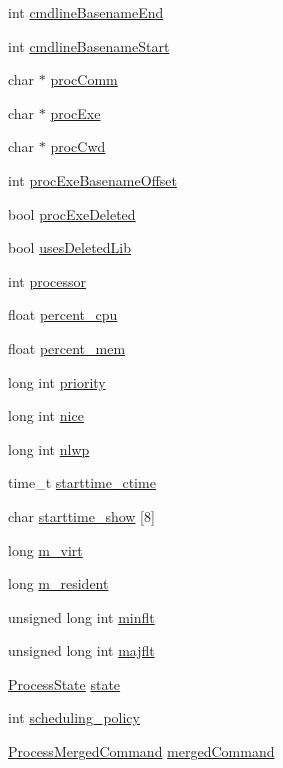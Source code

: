 \begin{DoxyCompactItemize}
\item 
int \hyperlink{structProcess___a2e09e6d44df324f8198c21f3d156bc2f}{cmdline\+Basename\+End}
\item 
int \hyperlink{structProcess___ab09f71b906aa1970ff0abfc0566582a5}{cmdline\+Basename\+Start}
\item 
char $\ast$ \hyperlink{structProcess___a241ff10766056dc26b25b012c05a07ce}{proc\+Comm}
\item 
char $\ast$ \hyperlink{structProcess___a998a39446c951d76abde48ef02d42089}{proc\+Exe}
\item 
char $\ast$ \hyperlink{structProcess___a51ff7b8452bfc3e3e7438219f88c3e98}{proc\+Cwd}
\item 
int \hyperlink{structProcess___a69db29693ef3689f1fe48d897f6270c2}{proc\+Exe\+Basename\+Offset}
\item 
bool \hyperlink{structProcess___a7e09e353d2f5030e4c48a63cf4691fb6}{proc\+Exe\+Deleted}
\item 
bool \hyperlink{structProcess___abd5b9284eb5b84fc55ecbae0713e2056}{uses\+Deleted\+Lib}
\item 
int \hyperlink{structProcess___a6c6a7b09d586b8982a4d7d4b7e06a6ff}{processor}
\item 
float \hyperlink{structProcess___add059b03abd4a3b0a4e21dc40ecd827a}{percent\+\_\+cpu}
\item 
float \hyperlink{structProcess___a6be09277141e5b74106b35e036289057}{percent\+\_\+mem}
\item 
long int \hyperlink{structProcess___a05c3aa291bcf1c2b058eeea8926f34b9}{priority}
\item 
long int \hyperlink{structProcess___a83f6bebe52f3723b5ca7a86567164bd4}{nice}
\item 
long int \hyperlink{structProcess___a8f1c2546df16590104ceb35aaea21a9b}{nlwp}
\item 
time\+\_\+t \hyperlink{structProcess___ac5925ef684f48f9544e7173fd1330758}{starttime\+\_\+ctime}
\item 
char \hyperlink{structProcess___a5b1599ab799622878ab248474061d4be}{starttime\+\_\+show} \mbox{[}8\mbox{]}
\item 
long \hyperlink{structProcess___ae765cc29129a0d3808fc486f0ab36a29}{m\+\_\+virt}
\item 
long \hyperlink{structProcess___afd27d34d1d903d222179edde94592555}{m\+\_\+resident}
\item 
unsigned long int \hyperlink{structProcess___a2770af6df2e6065de15a7a952bb9666c}{minflt}
\item 
unsigned long int \hyperlink{structProcess___a87af7e7904782a51e9cdd17a9eee6cdc}{majflt}
\item 
\hyperlink{Process_8h_a058a4a49f4578136dfcf39a19cd5d2ad}{Process\+State} \hyperlink{structProcess___a952ce166b520838a9b53987d1f7b9eea}{state}
\item 
int \hyperlink{structProcess___aa0bb323e685251a804202300ecc559e4}{scheduling\+\_\+policy}
\item 
\hyperlink{Process_8h_a5e8ba2e44bd69cd79bc65074a7ca174f}{Process\+Merged\+Command} \hyperlink{structProcess___a59289d121ba159ee758096c28202a949}{merged\+Command}
\end{DoxyCompactItemize}


